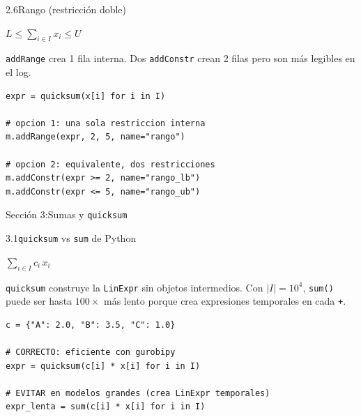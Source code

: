 \documentclass[10pt,a4paper]{article}
\newlength{\mathcolw}
\newlength{\codecolw}
\newcommand{\secheader}[2]{%
  \vspace{10pt}%
  \needspace{6cm}%
  \noindent%
  \begin{tcolorbox}[
    colback=sectionbg, colupper=white,
    colframe=sectionbg, sharp corners,
    left=8pt, right=8pt, top=5pt, bottom=5pt,
    fontupper=\large\bfseries\sffamily,
  ]
  Secci\'on #1:\enspace #2
  \end{tcolorbox}%
  \vspace{2pt}%
}
\newcommand{\entryheader}[1]{%
  \needspace{5cm}%
  \vspace{6pt}%
  \noindent%
  \begin{tcolorbox}[
    colback=subsecbg!18,
    colframe=subsecbg!45,
    sharp corners, boxrule=0.4pt,
    left=5pt, right=5pt, top=2pt, bottom=2pt,
    fontupper=\small\bfseries\sffamily,
  ]
  #1
  \end{tcolorbox}%
  \vspace{2pt}%
}
\newcommand{\py}[1]{\texttt{\small #1}}
\begin{document}
\entryheader{2.6\quad Rango (restricci\'on doble)}
\noindent
\begin{minipage}[t]{\mathcolw}
    \begin{tcolorbox}[mathbox]
        $L \leq \displaystyle\sum_{i \in I} x_i \leq U$
    \end{tcolorbox}
    \vspace{2pt}
    \begin{tcolorbox}[notebox]
        \py{addRange} crea 1 fila interna. Dos \py{addConstr} crean 2 filas pero son m\'as legibles en el log.
    \end{tcolorbox}
\end{minipage}\hspace{0.02\textwidth}%
\begin{minipage}[t]{\codecolw}
    \begin{lstlisting}[style=gurobipy]
expr = quicksum(x[i] for i in I)

# opcion 1: una sola restriccion interna
m.addRange(expr, 2, 5, name="rango")

# opcion 2: equivalente, dos restricciones
m.addConstr(expr >= 2, name="rango_lb")
m.addConstr(expr <= 5, name="rango_ub")
\end{lstlisting}
\end{minipage}

\vspace{4pt}

\secheader{3}{Sumas y \texttt{quicksum}}

\entryheader{3.1\quad \py{quicksum} vs \py{sum} de Python}
\noindent
\begin{minipage}[t]{\mathcolw}
    \begin{tcolorbox}[mathbox]
        $\displaystyle\sum_{i \in I} c_i\, x_i$
    \end{tcolorbox}
    \vspace{2pt}
    \begin{tcolorbox}[notebox]
        \py{quicksum} construye la \py{LinExpr} sin objetos intermedios. Con $|I|=10^4$, \py{sum()} puede ser hasta $100\times$ m\'as lento porque crea expresiones temporales en cada \py{+}.
    \end{tcolorbox}
\end{minipage}\hspace{0.02\textwidth}%
\begin{minipage}[t]{\codecolw}
    \begin{lstlisting}[style=gurobipy]
c = {"A": 2.0, "B": 3.5, "C": 1.0}

# CORRECTO: eficiente con gurobipy
expr = quicksum(c[i] * x[i] for i in I)

# EVITAR en modelos grandes (crea LinExpr temporales)
expr_lenta = sum(c[i] * x[i] for i in I)
\end{lstlisting}
\end{minipage}
\end{document}
